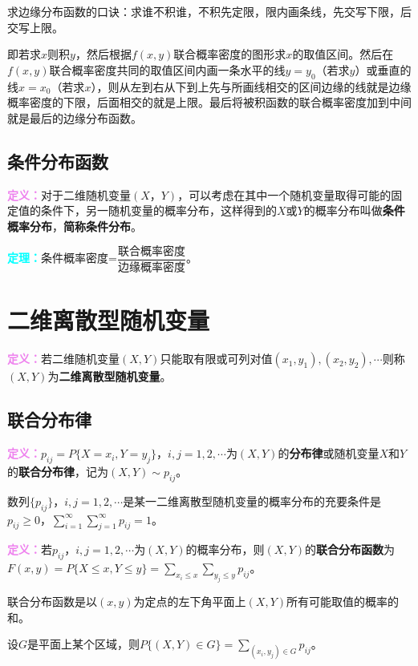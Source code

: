 求边缘分布函数的口诀：求谁不积谁，不积先定限，限内画条线，先交写下限，后交写上限。

即若求$x$则积$y$，然后根据$f(x,y)$联合概率密度的图形求$x$的取值区间。然后在$f(x,y)$联合概率密度共同的取值区间内画一条水平的线$y=y_0$（若求$y$）或垂直的线$x=x_0$（若求$x$），则从左到右从下到上先与所画线相交的区间边缘的线就是边缘概率密度的下限，后面相交的就是上限。最后将被积函数的联合概率密度加到中间就是最后的边缘分布函数。

\subsection{条件分布函数}

\textcolor{violet}{\textbf{定义：}}对于二维随机变量$(X，Y)$，可以考虑在其中一个随机变量取得可能的固定值的条件下，另一随机变量的概率分布，这样得到的$X$或$Y$的概率分布叫做\textbf{条件概率分布}，\textbf{简称条件分布}。

\textcolor{aqua}{\textbf{定理：}}条件概率密度=$\dfrac{\text{联合概率密度}}{\text{边缘概率密度}}$。

\section{二维离散型随机变量}

\textcolor{violet}{\textbf{定义：}}若二维随机变量$(X,Y)$只能取有限或可列对值$(x_1,y_1),(x_2,y_2),\cdots$则称$(X,Y)$为\textbf{二维离散型随机变量}。

\subsection{联合分布律}

\textcolor{violet}{\textbf{定义：}}$p_{ij}=P\{X=x_i,Y=y_j\}$，$i,j=1,2,\cdots$为$(X,Y)$的\textbf{分布律}或随机变量$X$和$Y$的\textbf{联合分布律}，记为$(X,Y)\sim p_{ij}$。

数列$\{p_{ij}\}$，$i,j=1,2,\cdots$是某一二维离散型随机变量的概率分布的充要条件是$p_{ij}\geqslant0$，$\sum\limits_{i=1}^\infty\sum\limits_{j=1}^\infty p_{ij}=1$。

\textcolor{violet}{\textbf{定义：}}若$p_{ij}$，$i,j=1,2,\cdots$为$(X,Y)$的概率分布，则$(X,Y)$的\textbf{联合分布函数}为$F(x,y)=P\{X\leqslant x,Y\leqslant y\}=\sum\limits_{x_i\leqslant x}\sum\limits_{y_j\leqslant y}p_{ij}$。

联合分布函数是以$(x,y)$为定点的左下角平面上$(X,Y)$所有可能取值的概率的和。

设$G$是平面上某个区域，则$P\{(X,Y)\in G\}=\sum\limits_{(x_i,y_j)\in G}p_{ij}$。


